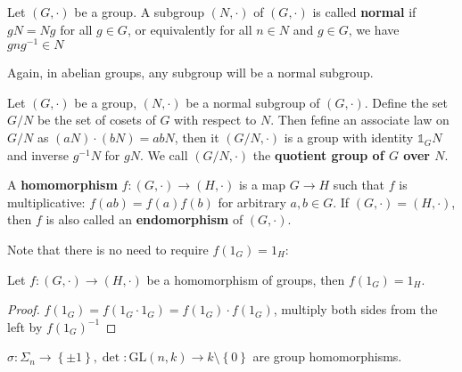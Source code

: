 \documentclass{note-eng}
\begin{document}
\begin{definition}
    Let $(G, \cdot)$ be a group. A subgroup $(N, \cdot)$ of $(G, \cdot)$ is called \textbf{normal} if $gN = Ng$ for all $g \in G$, or equivalently for all $n \in N$ and $g \in G$, we have $g n g ^{-1} \in N$
\end{definition}

Again, in abelian groups, any subgroup will be a normal subgroup.

\begin{definition}
    Let $(G, \cdot)$ be a group, $(N, \cdot)$ be a normal subgroup of $(G, \cdot)$. Define the set $G / N$ be the set of cosets of $G$ with respect to $N$. Then fefine an associate law on $G / N$ as $(aN) \cdot (bN) = abN$, then it $(G / N, \cdot)$ is a group with identity $\mathds{1}_G N$ and inverse $g ^{-1} N$ for $gN$. We call $(G / N, \cdot)$ the \textbf{quotient group of $G$ over $N$}.
\end{definition}

\begin{definition}
    A \textbf{homomorphism} $f: (G, \cdot) \rightarrow (H, \cdot)$ is a map $G \rightarrow H$ such that $f$ is multiplicative: $f(ab) = f(a)f(b)$ for arbitrary $a, b \in G$. If $(G, \cdot) = (H, \cdot)$, then $f$ is also called an \textbf{endomorphism} of $(G, \cdot)$.
\end{definition}

Note that there is no need to require $f(1_G) = 1_H$:

\begin{proposition}
    Let $f: (G, \cdot) \rightarrow (H, \cdot)$ be a homomorphism of groups, then $f(1_G) = 1_H$.
\end{proposition}

\begin{proof}
    $f(1_G) = f(1_G \cdot 1_G) = f(1_G) \cdot f(1_G)$, multiply both sides from the left by $f(1_G) ^{-1}$
\end{proof}

\begin{example}
    $\sigma: \Sigma_n \rightarrow \left\lbrace \pm 1 \right\rbrace, \det: \mathrm{GL}(n, k) \rightarrow k \setminus \left\lbrace 0 \right\rbrace$ are group homomorphisms.
\end{example}
\end{document}
